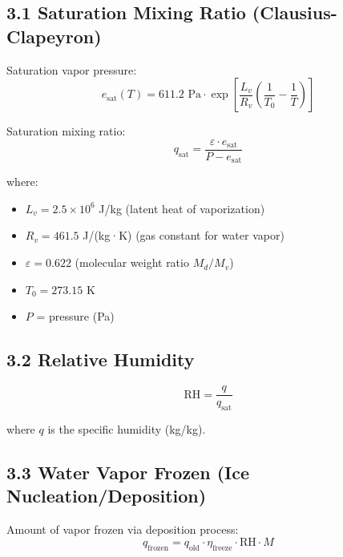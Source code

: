 \documentclass{article}
\begin{document}
\subsection*{3.1 Saturation Mixing Ratio (Clausius-Clapeyron)}

Saturation vapor pressure:
\begin{equation}
e_{\text{sat}}(T) = 611.2 \text{ Pa} \cdot \exp\left[\frac{L_v}{R_v} \left(\frac{1}{T_0} - \frac{1}{T}\right)\right]
\end{equation}

Saturation mixing ratio:
\begin{equation}
q_{\text{sat}} = \frac{\varepsilon \cdot e_{\text{sat}}}{P - e_{\text{sat}}}
\end{equation}

where:
\begin{itemize}
    \item $L_v = 2.5 \times 10^6$ J/kg (latent heat of vaporization)
    \item $R_v = 461.5$ J/(kg·K) (gas constant for water vapor)
    \item $\varepsilon = 0.622$ (molecular weight ratio $M_d / M_v$)
    \item $T_0 = 273.15$ K
    \item $P$ = pressure (Pa)
\end{itemize}

\subsection*{3.2 Relative Humidity}

\begin{equation}
\text{RH} = \frac{q}{q_{\text{sat}}}
\end{equation}

where $q$ is the specific humidity (kg/kg).

\subsection*{3.3 Water Vapor Frozen (Ice Nucleation/Deposition)}

Amount of vapor frozen via deposition process:
\begin{equation}
q_{\text{frozen}} = q_{\text{old}} \cdot \eta_{\text{freeze}} \cdot \text{RH} \cdot M
\end{equation}
\end{document}
